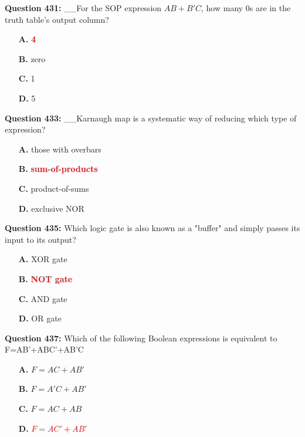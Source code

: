 \documentclass[12pt,a4paper]{article}
\begin{document}
\vspace{0.5cm}

\textbf{Question 431:} __For the SOP expression $AB + B'C$, how many 0s are in the truth table's output column?

\begin{itemize}
    \item[\textbf{A.}] \textcolor{red}{\textbf{4}}
    \item[\textbf{B.}] zero
    \item[\textbf{C.}] 1
    \item[\textbf{D.}] 5
\end{itemize}

\vspace{0.5cm}

\textbf{Question 433:} __Karnaugh map is a systematic way of reducing which type of expression?

\begin{itemize}
    \item[\textbf{A.}] those with overbars
    \item[\textbf{B.}] \textcolor{red}{\textbf{sum-of-products}}
    \item[\textbf{C.}] product-of-sums
    \item[\textbf{D.}] exclusive NOR
\end{itemize}

\vspace{0.5cm}

\textbf{Question 435:} Which logic gate is also known as a "buffer" and simply passes its input to its output?

\begin{itemize}
    \item[\textbf{A.}] XOR gate
    \item[\textbf{B.}] \textcolor{red}{\textbf{NOT gate}}
    \item[\textbf{C.}] AND gate
    \item[\textbf{D.}] OR gate
\end{itemize}

\vspace{0.5cm}

\textbf{Question 437:} Which of the following Boolean expressions is equivalent to F=AB'+ABC'+AB'C

\begin{itemize}
    \item[\textbf{A.}] $F = AC + AB'$
    \item[\textbf{B.}] $F = A'C + AB'$
    \item[\textbf{C.}] $F = AC + AB$
    \item[\textbf{D.}] \textcolor{red}{\textbf{$F = AC' + AB'$}}
\end{itemize}
\end{document}
